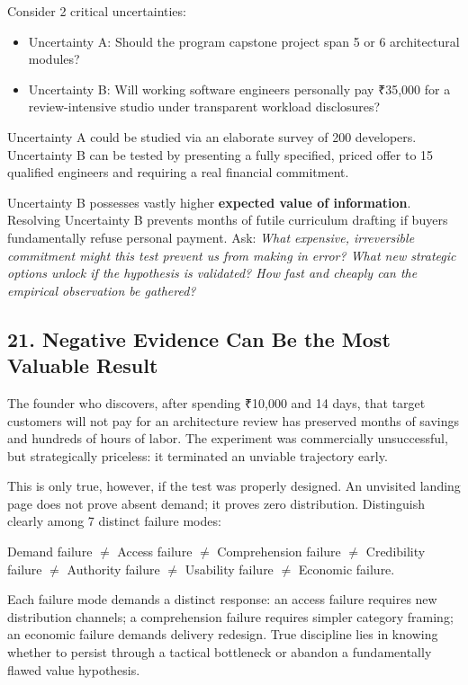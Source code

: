 Consider 2 critical uncertainties:
\begin{itemize}
    \item Uncertainty A: Should the program capstone project span 5 or 6 architectural modules?
    \item Uncertainty B: Will working software engineers personally pay ₹35,000 for a review-intensive studio under transparent workload disclosures?
\end{itemize}

Uncertainty A could be studied via an elaborate survey of 200 developers. Uncertainty B can be tested by presenting a fully specified, priced offer to 15 qualified engineers and requiring a real financial commitment.

Uncertainty B possesses vastly higher \textbf{expected value of information}. Resolving Uncertainty B prevents months of futile curriculum drafting if buyers fundamentally refuse personal payment. Ask: \emph{What expensive, irreversible commitment might this test prevent us from making in error? What new strategic options unlock if the hypothesis is validated? How fast and cheaply can the empirical observation be gathered?}

\subsection*{21. Negative Evidence Can Be the Most Valuable Result}

The founder who discovers, after spending ₹10,000 and 14 days, that target customers will not pay for an architecture review has preserved months of savings and hundreds of hours of labor. The experiment was commercially unsuccessful, but strategically priceless: it terminated an unviable trajectory early.

This is only true, however, if the test was properly designed. An unvisited landing page does not prove absent demand; it proves zero distribution. Distinguish clearly among 7 distinct failure modes:
\begin{center}
Demand failure $\neq$ Access failure $\neq$ Comprehension failure $\neq$ Credibility failure $\neq$ Authority failure $\neq$ Usability failure $\neq$ Economic failure.
\end{center}

Each failure mode demands a distinct response: an access failure requires new distribution channels; a comprehension failure requires simpler category framing; an economic failure demands delivery redesign. True discipline lies in knowing whether to persist through a tactical bottleneck or abandon a fundamentally flawed value hypothesis.


